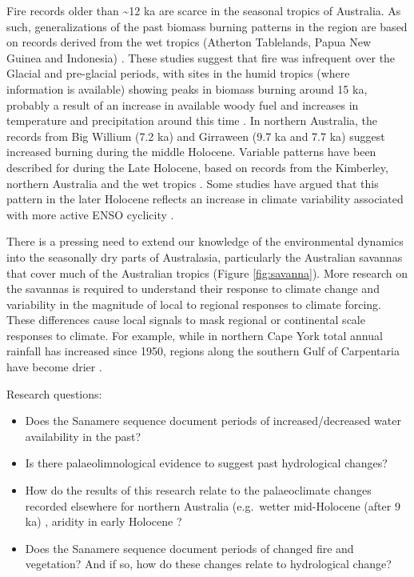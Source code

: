 \documentclass[
  12pt,
]{book}
\begin{document}
Fire records older than \textasciitilde12 ka are scarce in the seasonal tropics of Australia. As such, generalizations of the past biomass burning patterns in the region are based on records derived from the wet tropics (Atherton Tablelands, Papua New Guinea and Indonesia) \citep{haberleBiomassBurningIndonesia2001, mooneyLateQuaternaryFire2011}. These studies suggest that fire was infrequent over the Glacial and pre-glacial periods, with sites in the humid tropics (where information is available) showing peaks in biomass burning around 15 ka, probably a result of an increase in available woody fuel and increases in temperature and precipitation around this time \citep{haberleBiomassBurningIndonesia2001, mooneyLateQuaternaryFire2011}. In northern Australia, the records from Big Willium (7.2 ka) \citep{stevensonPalaeoenvironmentalHistoryBig2015} and Girraween (9.7 ka and 7.7 ka) \citep{roweHoloceneSavannaDynamics2019} suggest increased burning during the middle Holocene. Variable patterns have been described for during the Late Holocene, based on records from the Kimberley, northern Australia and the wet tropics \citep{rowePalynologicalInvestigationHolocene2007, roweLateHoloceneSwamp2015, fieldCoherentPatternsEnvironmental2018, haberle23000yrPollen2005}. Some studies have argued that this pattern in the later Holocene reflects an increase in climate variability associated with more active ENSO cyclicity \citep{mooneyLateQuaternaryFire2011, kershawCompletePollenRecord2007}.

There is a pressing need to extend our knowledge of the environmental dynamics into the seasonally dry parts of Australasia, particularly the Australian savannas that cover much of the Australian tropics (Figure \ref{fig:savanna}). More research on the savannas is required to understand their response to climate change and variability in the magnitude of local to regional responses to climate forcing. These differences cause local signals to mask regional or continental scale responses to climate. For example, while in northern Cape York total annual rainfall has increased since 1950, regions along the southern Gulf of Carpentaria have become drier \citep{bomMonthlyClimateStatistics2018}.

Research questions:

\begin{itemize}
\item
  Does the Sanamere sequence document periods of increased/decreased water availability in the past?
\item
  Is there palaeolimnological evidence to suggest past hydrological changes?
\item
  How do the results of this research relate to the palaeoclimate changes recorded elsewhere for northern Australia (e.g.~wetter mid-Holocene (after 9 ka) \citep{lulyHolocenePalaeoenvironmentsChange2006}, aridity in early Holocene \citep{nottEarlyHoloceneAridityTropical1999}?
\item
  Does the Sanamere sequence document periods of changed fire and vegetation? And if so, how do these changes relate to hydrological change?
\end{itemize}
\end{document}
